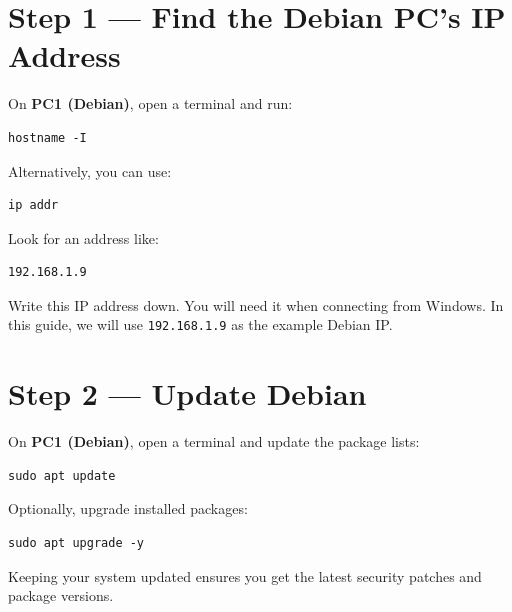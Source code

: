 \documentclass[a4paper,12pt]{article}
\newcommand{\code}[1]{\texttt{\small #1}}
\begin{document}
\section{Step 1 --- Find the Debian PC's IP Address}

On \textbf{PC1 (Debian)}, open a terminal and run:

\begin{lstlisting}[style=bashstyle]
hostname -I
\end{lstlisting}

Alternatively, you can use:

\begin{lstlisting}[style=bashstyle]
ip addr
\end{lstlisting}

Look for an address like:

\begin{lstlisting}[style=textstyle]
192.168.1.9
\end{lstlisting}

\begin{notebox}
Write this IP address down. You will need it when connecting from Windows. In this guide, we will use \code{192.168.1.9} as the example Debian IP.
\end{notebox}

\section{Step 2 --- Update Debian}

On \textbf{PC1 (Debian)}, open a terminal and update the package lists:

\begin{lstlisting}[style=bashstyle]
sudo apt update
\end{lstlisting}

Optionally, upgrade installed packages:

\begin{lstlisting}[style=bashstyle]
sudo apt upgrade -y
\end{lstlisting}

\begin{tipbox}
Keeping your system updated ensures you get the latest security patches and package versions.
\end{tipbox}

\end{document}
